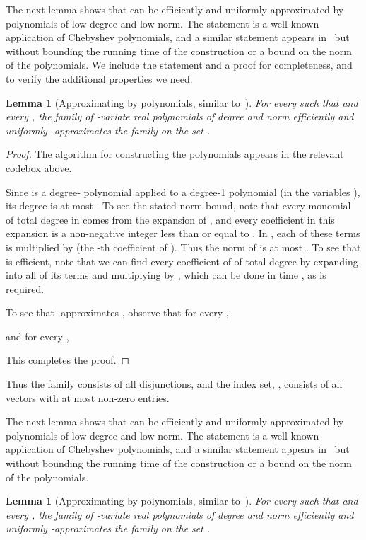 \documentclass[11pt]{article}
\newtheorem{lemma}[theorem]{Lemma}
\theoremstyle{definition}
\begin{document}
The next lemma shows that  can be efficiently and uniformly approximated by polynomials of low degree and low norm.  The statement is a well-known application of Chebyshev polynomials, and a similar statement appears in~\cite{HardtRoSe12} but without bounding the running time of the construction or a bound on the norm of the polynomials.  We include the statement and a proof for completeness, and to verify the additional properties we need. 

\begin{lemma}[Approximating  by polynomials, similar to~\cite{HardtRoSe12}] \label{thm:approxdisj}
For every  such that  and every , the family  of -variate real polynomials of degree  and norm  efficiently and uniformly -approximates the family  on the set .
\end{lemma}
\begin{proof}
The algorithm  for constructing the polynomials appears in the relevant codebox above.
\begin{algorithm}

\begin{algorithmic}
\end{algorithmic}
\end{algorithm}

Since  is a degree- polynomial applied to a degree-1 polynomial (in the variables ), its degree is at most .  To see the stated norm bound, note that every monomial of total degree  in  comes from the expansion of , and every coefficient in this expansion is a non-negative integer less than or equal to . In , each of these terms is multiplied by  (the -th coefficient of ).  Thus the norm of  is at most .  To see that  is efficient, note that we can find every coefficient of  of total degree  by expanding  into all of its  terms and multiplying by , which can be done in time , as is required.

To see that  -approximates , observe that for every ,

and for every ,

This completes the proof.
\end{proof}
\else
Thus the family  consists of all disjunctions, and the index set, , consists of all vectors  with at most  non-zero entries.  

The next lemma shows that  can be efficiently and uniformly approximated by polynomials of low degree and low norm.  The statement is a well-known application of Chebyshev polynomials, and a similar statement appears in~\cite{HardtRoSe12} but without bounding the running time of the construction or a bound on the norm of the polynomials. 
\begin{lemma}[Approximating  by polynomials, similar to~\cite{HardtRoSe12}] \label{thm:approxdisj}
For every  such that  and every , the family  of -variate real polynomials of degree  and norm  efficiently and uniformly -approximates the family  on the set .
\end{lemma}
\fi
\end{document}

